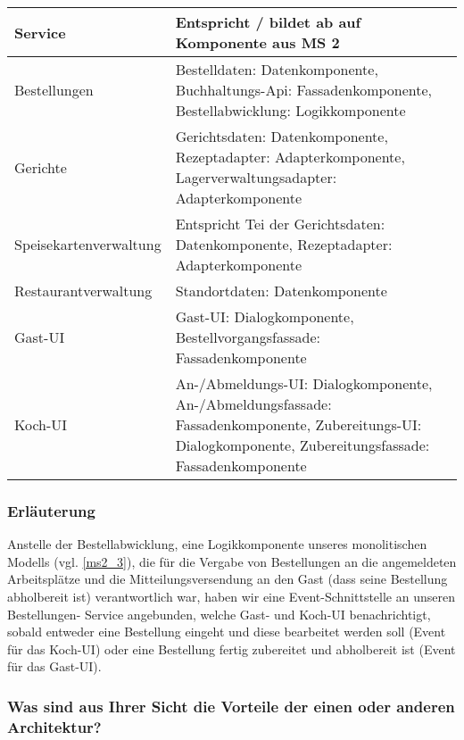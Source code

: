 \begin{tabu} to 
\hline{}
Service &Entspricht / bildet ab auf Komponente aus MS 2 \\
\hline
Bestellungen &Bestelldaten: Datenkomponente,
  Buchhaltungs-Api: Fassadenkomponente,
  Bestellabwicklung: Logikkomponente
  \\
\hline
Gerichte &Gerichtsdaten: Datenkomponente,
  Rezeptadapter: Adapterkomponente,
  Lagerverwaltungsadapter: Adapterkomponente
  \\
\hline
Speisekartenver\-waltung &Entspricht Tei der Gerichtsdaten:
  Datenkomponente, Rezeptadapter: Adapterkomponente \\
\hline
Restaurantver\-waltung &Standortdaten: Datenkomponente \\
\hline
Gast-UI &Gast-UI: Dialogkomponente,
  Bestellvorgangsfassade: Fassadenkomponente \\
\hline
Koch-UI &An-/Abmeldungs-UI: Dialogkomponente,
  An-/Abmeldungsfassade: Fassadenkomponente,
  Zubereitungs-UI: Dialogkomponente,
  Zubereitungsfassade: Fassadenkomponente
  \\
\hline
\end{tabu}

\subsubsection*{Erl\"auterung}

Anstelle der Bestellabwicklung, eine Logikkomponente
unseres monolitischen Modells (vgl. \ref{ms2_3}), die
f\"ur die Vergabe von Bestellungen an die angemeldeten
Arbeitspl\"atze und die Mitteilungsversendung an den Gast
(dass seine Bestellung abholbereit ist) verantwortlich war,
haben wir eine Event-Schnittstelle an unseren Bestellungen-
Service angebunden, welche Gast- und Koch-UI
benachrichtigt, sobald entweder eine Bestellung eingeht
und diese bearbeitet werden soll (Event f\"ur das Koch-UI)
oder eine Bestellung fertig zubereitet und abholbereit ist
(Event f\"ur das Gast-UI).

\subsubsection*{Was sind aus Ihrer Sicht die Vorteile der
  einen oder anderen Architektur?}


